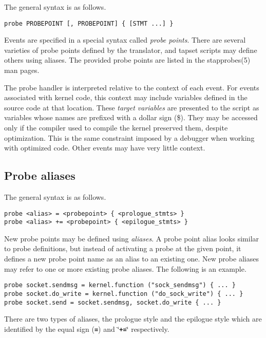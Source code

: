 \documentclass[twoside,english]{article}
\newenvironment{vindent}
{\begin{list}{}{\setlength{\listparindent}{6pt}}
\item[]}
{\end{list}}
\begin{document}
The general syntax is as follows.

\begin{vindent}
\begin{verbatim}
probe PROBEPOINT [, PROBEPOINT] { [STMT ...] }
\end{verbatim}
\end{vindent}
Events are specified in a special syntax called \emph{probe points}. There
are several varieties of probe points defined by the translator, and tapset
scripts may define others using aliases. The provided probe points are listed
in the stapprobes(5) man pages.

The probe handler is interpreted relative to the context of each event. For
events associated with kernel code, this context may include variables defined
in the source code at that location. These \emph{target variables}
are presented to the script as variables whose names are prefixed with a
dollar sign (\$). They may be accessed only if the compiler used to compile
the kernel preserved them, despite optimization. This is the same constraint
imposed by a debugger when working with optimized code. Other events may
have very little context.


\subsection{Probe aliases\label{sub:Probe-aliases}}
The general syntax is as follows.

\begin{vindent}
\begin{verbatim}
probe <alias> = <probepoint> { <prologue_stmts> }
probe <alias> += <probepoint> { <epilogue_stmts> }
\end{verbatim}
\end{vindent}
New probe points may be defined using \emph{aliases}. A probe point alias
looks similar to probe definitions, but instead of activating a probe at
the given point, it defines a new probe point name as an alias to an existing
one. New probe aliases may refer to one or more existing probe aliases. The
following is an example.

\begin{vindent}
\begin{verbatim}
probe socket.sendmsg = kernel.function ("sock_sendmsg") { ... }
probe socket.do_write = kernel.function ("do_sock_write") { ... }
probe socket.send = socket.sendmsg, socket.do_write { ... }
\end{verbatim}
\end{vindent}
There are two types of aliases, the prologue style and the epilogue style
which are identified by the equal sign (\texttt{\textbf{=}}) and \char`\"{}\texttt{\textbf{+=}}\char`\"{}
respectively.
\end{document}
